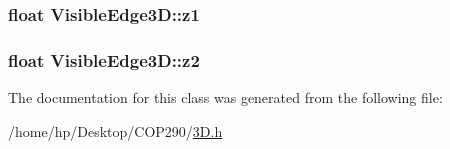\subsubsection[{\texorpdfstring{z1}{z1}}]{\setlength{\rightskip}{0pt plus 5cm}float Visible\+Edge3\+D\+::z1}\hypertarget{class_visible_edge3_d_ad080d0b1f9c8327bb691f421b8f04e3f}{}\label{class_visible_edge3_d_ad080d0b1f9c8327bb691f421b8f04e3f}
\subsubsection[{\texorpdfstring{z2}{z2}}]{\setlength{\rightskip}{0pt plus 5cm}float Visible\+Edge3\+D\+::z2}\hypertarget{class_visible_edge3_d_a90b18a97ee484e34b2dc18cadb2366f7}{}\label{class_visible_edge3_d_a90b18a97ee484e34b2dc18cadb2366f7}


The documentation for this class was generated from the following file\+:\begin{DoxyCompactItemize}
\item 
/home/hp/\+Desktop/\+C\+O\+P290/\hyperlink{3_d_8h}{3\+D.\+h}\end{DoxyCompactItemize}
